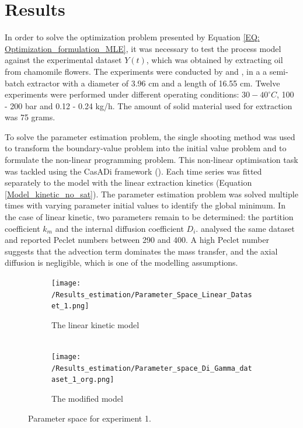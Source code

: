 \documentclass[a4paper,fleqn]{cas-dc}
\begin{document}
\section{Results}

\label{CH: Results}

{\color{blue}In order to solve the optimization problem presented by Equation \ref{EQ: Optimization_formulation_MLE}, it was necessary to test the process model against the experimental dataset $Y(t)$, which was obtained by extracting oil from chamomile flowers. The experiments were conducted by \citet{Povh2001} and \citet{Rahimi2011}, in a a semi-batch extractor with a diameter of 3.96 cm and a length of 16.55 cm. Twelve experiments were performed under different operating conditions: $30-40^\circ C$, 100 - 200 bar and 0.12 - 0.24 kg/h. The amount of solid material used for extraction was 75 grams. }

To solve the parameter estimation problem, the single shooting method was used to transform the boundary-value problem into the initial value problem and to formulate the non-linear programming problem. This non-linear optimisation task was tackled using the CasADi framework (\citet{Andersson2018}). Each time series was fitted separately to the model with the linear extraction kinetics (Equation \ref{Model_kinetic_no_sat}). The parameter estimation problem was solved multiple times with varying parameter initial values to identify the global minimum. In the case of linear kinetic, two parameters remain to be determined: the partition coefficient $k_m$ and the internal diffusion coefficient $D_i$. \citet{Rahimi2011} analysed the same dataset and reported Peclet numbers between 290 and 400. A high Peclet number suggests that the advection term dominates the mass transfer, and the axial diffusion is negligible, which is one of the modelling assumptions.

\begin{figure}[!h]
	\centering
	\begin{subfigure}{0.9\columnwidth}
		\centering
		\texttt{[image: /Results\_estimation/Parameter\_Space\_Linear\_Dataset\_1.png]}
		\caption{The linear kinetic model \\ ~}
		\label{fig: Fit_1_linear}
	\end{subfigure}
	\hfill
	\begin{subfigure}{0.9\columnwidth}
		\centering
		\texttt{[image: /Results\_estimation/Parameter\_space\_Di\_Gamma\_dataset\_1\_org.png]}
		\caption{The modified model}
		\label{fig: Fit_1_Di_Gamma}
	\end{subfigure}
	\caption{Parameter space for experiment 1.}
\end{figure}
\end{document}

